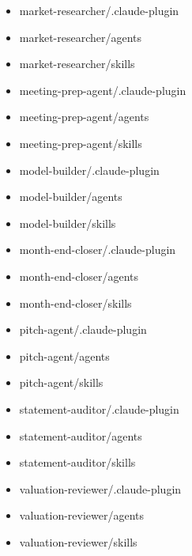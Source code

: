 \documentclass[11pt]{article}
\begin{document}
\begin{itemize}[leftmargin=*,itemsep=1pt,topsep=2pt]
\item \hspace*{0.9em}market-researcher/.claude-plugin
\item \hspace*{0.9em}market-researcher/agents
\item \hspace*{0.9em}market-researcher/skills
\item \hspace*{0.9em}meeting-prep-agent/.claude-plugin
\item \hspace*{0.9em}meeting-prep-agent/agents
\item \hspace*{0.9em}meeting-prep-agent/skills
\item \hspace*{0.9em}model-builder/.claude-plugin
\item \hspace*{0.9em}model-builder/agents
\item \hspace*{0.9em}model-builder/skills
\item \hspace*{0.9em}month-end-closer/.claude-plugin
\item \hspace*{0.9em}month-end-closer/agents
\item \hspace*{0.9em}month-end-closer/skills
\item \hspace*{0.9em}pitch-agent/.claude-plugin
\item \hspace*{0.9em}pitch-agent/agents
\item \hspace*{0.9em}pitch-agent/skills
\item \hspace*{0.9em}statement-auditor/.claude-plugin
\item \hspace*{0.9em}statement-auditor/agents
\item \hspace*{0.9em}statement-auditor/skills
\item \hspace*{0.9em}valuation-reviewer/.claude-plugin
\item \hspace*{0.9em}valuation-reviewer/agents
\item \hspace*{0.9em}valuation-reviewer/skills

\end{itemize}
\end{document}

